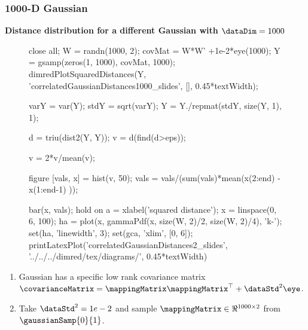 \begin{frame}[fragile]
  \frametitle{1000-D Gaussian}

  \textbf{Distance distribution for a different Gaussian with $\dataDim=1000$}

  \begin{figure}
    \begin{matlab}
    close all;
    W = randn(1000, 2);
    covMat = W*W' +1e-2*eye(1000);
    Y = gsamp(zeros(1, 1000), covMat, 1000);
    dimredPlotSquaredDistances(Y, 'correlatedGaussianDistances1000_slides', [], 0.45*textWidth);

    varY = var(Y);
    stdY = sqrt(varY);
    Y = Y./repmat(stdY, size(Y, 1), 1);

    d = triu(dist2(Y, Y));
    v = d(find(d>eps));

    v = 2*v/mean(v);

    figure
    [vals, x] = hist(v, 50);
    vals = vals/(sum(vals)*mean(x(2:end) - x(1:end-1) ));

    bar(x, vals);
    hold on
    a = xlabel('squared distance');
    x = linspace(0, 6, 100);
    ha = plot(x, gammaPdf(x, size(W, 2)/2, size(W, 2)/4), 'k-');
    set(ha, 'linewidth', 3);
    set(gca, 'xlim', [0, 6]);
    printLatexPlot('correlatedGaussianDistances2_slides', '../../../dimred/tex/diagrams/', 0.45*textWidth)
    \end{matlab}

    \begin{center}
    \end{center}

  \end{figure}


  \begin{enumerate}
  \item<2->Gaussian has a specific low rank covariance matrix $\covarianceMatrix=\mappingMatrix\mappingMatrix^{\top}+\dataStd^{2}\eye$.
    
  \item<2->Take $\dataStd^{2}=1e-2$ and sample $\mappingMatrix\in\Re^{1000\times2}$
     from $\gaussianSamp{0}{1}$.
  \end{enumerate}


\end{frame}


